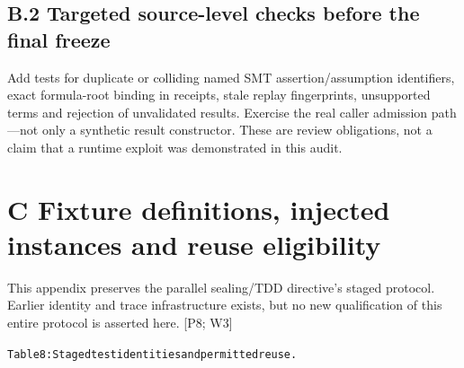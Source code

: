 \subsection*{B.2 Targeted source-level checks before the final freeze}

Add tests for duplicate or colliding named SMT assertion/assumption identifiers, exact formula-root
binding in receipts, stale replay fingerprints, unsupported terms and rejection of unvalidated results.
Exercise the real caller admission path—not only a synthetic result constructor. These are review
obligations, not a claim that a runtime exploit was demonstrated in this audit.

\section*{C Fixture definitions, injected instances and reuse eligibility}
This appendix preserves the parallel sealing/TDD directive’s staged protocol. Earlier identity and
trace infrastructure exists, but no new qualification of this entire protocol is asserted here. [P8; W3]

\begingroup\fontsize{7}{8.4}\selectfont
\begin{alltt}
Table 8: Staged test identities and permitted reuse.
\end{alltt}\endgroup


